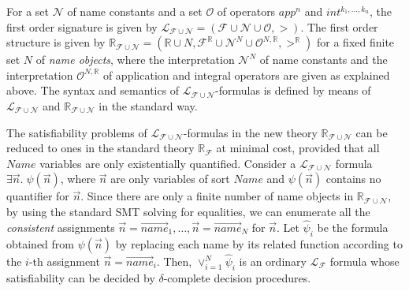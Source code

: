 \begin{definition}
For a  set $\mathcal{N}$ of name constants
and a set  $\mathcal{O}$ of operators  $\mathit{app}^n$ and  $\mathit{int}^{k_1,\ldots,k_n}$,
the first order signature is given by 
$\mathcal{L}_{\mathcal{F}\cup\mathcal{N}} = (\mathcal{F} \cup \mathcal{N} \cup \mathcal{O}, >)$.
%
The first order structure is given by
$\mathbb{R}_{\mathcal{F}\cup\mathcal{N}} 
= (\mathbb{R} \cup N, \mathcal{F}^\mathbb{R} \cup \mathcal{N}^N \cup \mathcal{O}^{N,\mathbb{R}}, >^\mathbb{R})$
for a fixed finite set $N$ of \emph{name objects},
where the interpretation $\mathcal{N}^N$ of name constants and 
the interpretation $\mathcal{O}^{N,\mathbb{R}}$ of application and integral operators 
are given as explained above.
%
The syntax and semantics of $\mathcal{L}_{\mathcal{F}\cup\mathcal{N}}$-formulas 
is defined by means of $\mathcal{L}_{\mathcal{F}\cup\mathcal{N}}$ and $\mathbb{R}_{\mathcal{F}\cup\mathcal{N}}$
in the standard way.
\end{definition}



The satisfiability problems of $\mathcal{L}_{\mathcal{F}\cup\mathcal{N}}$-formulas in the new theory 
$\mathbb{R}_{\mathcal{F}\cup\mathcal{N}}$
can be reduced to ones in the standard theory $\mathbb{R}_\mathcal{F}$ at minimal cost,
provided that all $\mathit{Name}$ variables %
are only existentially quantified.
Consider a $\mathcal{L}_{\mathcal{F}\cup\mathcal{N}}$ formula 
$\exists \vec{n}.\; \psi(\vec{n})$, where 
$\vec{n}$ are only variables of sort $\mathit{Name}$ %
and
$\psi(\vec{n})$ contains no quantifier for $\vec{n}$.
Since there are only a finite number of name objects in $\mathbb{R}_{\mathcal{F}\cup\mathcal{N}}$,
by using the standard SMT solving for equalities,
we can enumerate all the \emph{consistent} assignments 
$\vec{n} = \overrightarrow{\mathit{name}}_1,\ldots,\vec{n} = \overrightarrow{\mathit{name}}_N$ for $\vec{n}$.
Let $\hat{\psi}_i$ be the formula obtained from $\psi(\vec{n})$
by replacing each name by its related function according to the $i$-th assignment $\vec{n} = \overrightarrow{\mathit{name}}_i$.
Then, $\vee_{i=1}^N \hat{\psi}_i$ is an ordinary $\mathcal{L}_\mathcal{F}$ formula
whose satisfiability can be decided by %
$\delta$-complete decision procedures.


